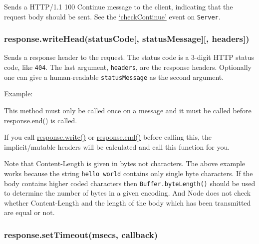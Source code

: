 Sends a HTTP/1.1 100 Continue message to the client, indicating that the
request body should be sent. See the
\hyperref[httpux5feventux5fcheckcontinue]{`checkContinue'} event on
\texttt{Server}.

\subsubsection{response.writeHead(statusCode{[}, statusMessage{]}{[},
headers{]})}\label{response.writeheadstatuscode-statusmessage-headers}

Sends a response header to the request. The status code is a 3-digit
HTTP status code, like \texttt{404}. The last argument,
\texttt{headers}, are the response headers. Optionally one can give a
human-readable \texttt{statusMessage} as the second argument.

Example:

\begin{Shaded}
\begin{Highlighting}[]
 \NormalTok{;}
\NormalTok{(}\NormalTok{, \{}
  \NormalTok{: }\NormalTok{,}
  \NormalTok{: } \NormalTok{\});}
\end{Highlighting}
\end{Shaded}

This method must only be called once on a message and it must be called
before
\hyperref[httpux5fresponseux5fendux5fdataux5fencoding]{response.end()}
is called.

If you call
\hyperref[httpux5fresponseux5fwriteux5fchunkux5fencoding]{response.write()}
or
\hyperref[httpux5fresponseux5fendux5fdataux5fencoding]{response.end()}
before calling this, the implicit/mutable headers will be calculated and
call this function for you.

Note that Content-Length is given in bytes not characters. The above
example works because the string
\texttt{\textquotesingle{}hello\ world\textquotesingle{}} contains only
single byte characters. If the body contains higher coded characters
then \texttt{Buffer.byteLength()} should be used to determine the number
of bytes in a given encoding. And Node does not check whether
Content-Length and the length of the body which has been transmitted are
equal or not.

\subsubsection{response.setTimeout(msecs,
callback)}\label{response.settimeoutmsecs-callback}

